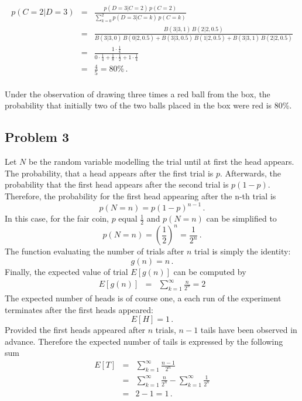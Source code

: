\documentclass{scrartcl}
\begin{document}
\begin{eqnarray}
p(C=2 | D=3) &=& \frac{p(D=3 | C=2) \, p(C=2)}{\sum_{k=0}^{2} p(D=3 | C=k) \, p(C=k)}\\
&=& \frac{B(3|3,1) \, B(2|2, 0.5)}{B(3|3,0) \, B(0|2, 0.5) + B(3|3,0.5) \, B(1|2, 0.5) + B(3|3,1) \, B(2|2,0.5)}\\
&=& \frac{1 \cdot \frac{1}{4}}{0\cdot \frac{1}{4} + \frac{1}{8} \cdot \frac{1}{2} + 1 \cdot \frac{1}{4}}\\
&=& \frac{4}{5} = 80\% \, .\\
\end{eqnarray}

Under the observation of drawing three times a red ball from the box, the probability that initially two of the two balls placed in the box were red is 80\%.
\subsection{Problem 3} %
\label{sec:problem_3}
Let $N$ be the random variable modelling the trial until at first the head appears.
The probability, that a head appears after the first trial is $p$. 
Afterwards, the probability that the first head appears after the second trial is $p (1-p)$.
Therefore, the probability for the first head appearing after the n-th trial is
\begin{equation}
	p(N = n) = p (1-p)^{n-1} \, .
\end{equation}
In this case, for the fair coin, $p$ equal $\frac{1}{2}$ and $p(N = n)$ can be simplified to
\begin{equation}
	p(N = n) = \left(\frac{1}{2}\right)^{n} = \frac{1}{2^n} \, .
\end{equation}
The function evaluating the number of trials after $n$ trial is simply the identity:
\begin{equation}
	g(n) = n \, .
\end{equation}
Finally, the expected value of trial $E\left[g(n)\right]$ can be computed by
\begin{eqnarray}
	E\left[g(n)\right] &=& \sum\limits_{k=1}^{\infty}\frac{n}{2^n} = 2	
\end{eqnarray}
The expected number of heads is of course one, a each run of the experiment terminates after the first heads appeared:
\begin{equation}
	E\left[H\right] = 1 \, .
\end{equation}
Provided the first heads appeared after $n$ trials, $n-1$ tails have been observed in advance.
Therefore the expected number of tails is expressed by the following sum
\begin{eqnarray}
	E\left[T\right] &=& \sum\limits_{k=1}^\infty \frac{n-1}{2^n} \\
	&=& \sum\limits_{k=1}^{\infty}\frac{n}{2^n} - \sum\limits_{k=1}^{\infty}\frac{1}{2^n}\\
	&=& 2 - 1 = 1 \, .
\end{eqnarray}
\end{document}
